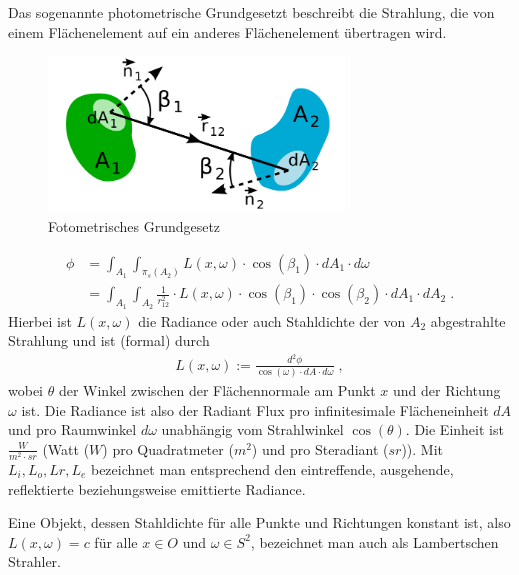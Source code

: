 \begin{Satz}

Das sogenannte photometrische Grundgesetzt beschreibt die Strahlung, die von einem  Flächenelement auf ein anderes  Flächenelement 
übertragen wird.  
 \begin{figure}[H]
    \centering
    \includegraphics[width=0.7\textwidth]{images/Fotometrisches_Grundgesetz_Schema.png}
    \caption{Fotometrisches Grundgesetz}
    \label{fig:cray}
\end{figure}

\begin{align}
\phi &= \int_{A_1} \int_{\pi_s(A_2)} L(x, \omega)\cdot \cos(\beta_1) \cdot dA_1 \cdot d \omega \\
&= \int_{A_1} \int_{A_2} \frac{1}{r_{12}^2}  \cdot L(x, \omega) \cdot \cos(\beta_1) \cdot \cos(\beta_2) \cdot dA_1 \cdot d A_2 \; .
\end{align}
Hierbei ist $L(x, \omega)$   die Radiance oder auch Stahldichte  der von $A_2$ abgestrahlte Strahlung  und ist (formal) durch  
\begin{align}
L(x, \omega) := \frac{d^2 \phi}{\cos(\omega) \cdot dA \cdot d\omega} \; ,
\end{align}
wobei $\theta$ der Winkel zwischen der Flächennormale am Punkt $x$ und der Richtung $\omega$ ist.
Die Radiance ist also der Radiant Flux pro infinitesimale Flächeneinheit $dA$ und pro  Raumwinkel $d \omega$ unabhängig vom Strahlwinkel $\cos(\theta)$.
Die Einheit ist $\frac{W}{m^2\cdot sr}$ (Watt ($W$) pro Quadratmeter ($m^2$) und pro Steradiant ($sr$)). 
Mit $L_i, L_o,Lr,L_e$ bezeichnet man entsprechend den eintreffende, ausgehende, reflektierte beziehungsweise emittierte Radiance.
\end{Satz}

\begin{Definition}
Eine Objekt, dessen Stahldichte für alle Punkte und Richtungen konstant ist, also
$L(x, \omega) = c$  für alle $x \in O$ und $\omega \in S^2$, bezeichnet man auch als Lambertschen Strahler. 
\end{Definition}

